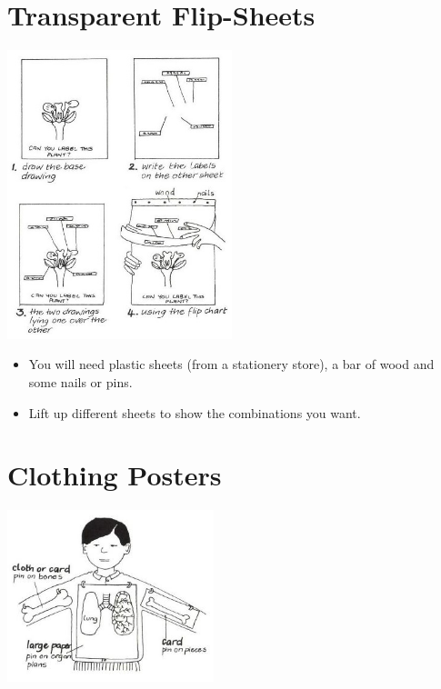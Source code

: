 \begin{multicols}{2}
\section{Transparent Flip-Sheets}

\begin{center}
\includegraphics[width=0.49\textwidth]{./img/vso/transparent-display.jpg}
\end{center}

\begin{itemize}
\item You will need plastic sheets (from a stationery store), a bar of wood and some nails or pins.
\item Lift up different sheets to show the combinations you want.
\end{itemize}


\section{Clothing Posters}

\begin{center}
\includegraphics[width=0.45\textwidth]{./img/vso/clothing-poster.jpg}
\end{center}


\end{multicols}
